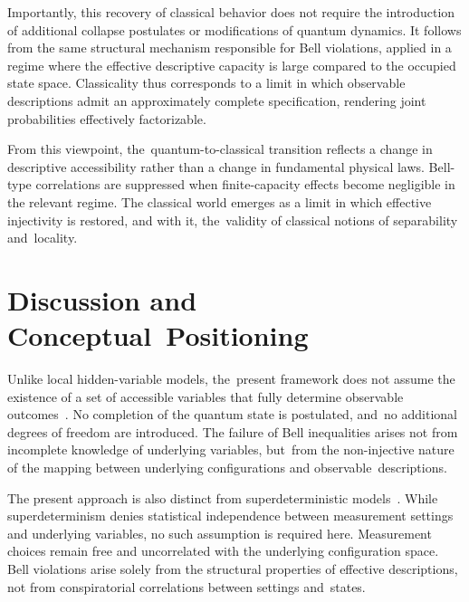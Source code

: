 \documentclass[quantumrep,article,accept,pdftex,oneauthor]{Definitions/mdpi}
\theoremstyle{remark}
\begin{document}
  Importantly, this recovery of classical behavior does not require the introduction
  of additional collapse postulates or modifications of quantum dynamics.
  It follows from the same structural mechanism responsible for Bell violations,
  applied in a regime where the effective descriptive capacity is large compared to
  the occupied state space.
  Classicality thus corresponds to a limit in which observable descriptions admit an
  approximately complete specification, rendering joint probabilities effectively
  factorizable.

  From this viewpoint, the~quantum-to-classical transition reflects a change in
  descriptive accessibility rather than a change in fundamental physical laws.
  Bell-type correlations are suppressed when finite-capacity effects become negligible
  in the relevant regime.
  The classical world emerges as a limit in which effective injectivity is restored,
  and with it, the~validity of classical notions of separability and~locality.

  \section{Discussion and Conceptual~Positioning}
  \label{sec:discussion}


  Unlike local hidden-variable models, the~present framework does not assume the
  existence of a set of accessible variables that fully determine observable outcomes~\cite{tHooft2016CAI}.
  No completion of the quantum state is postulated, and~no additional degrees of
  freedom are introduced.
  The failure of Bell inequalities arises not from incomplete knowledge of underlying
  variables, but~from the non-injective nature of the mapping between underlying
  configurations and observable~descriptions.

  The present approach is also distinct from superdeterministic models~\cite{Hall2010LocalDeterministic}.
  While superdeterminism denies statistical independence between measurement settings
  and underlying variables, no such assumption is required here.
  Measurement choices remain free and uncorrelated with the underlying configuration space.
  Bell violations arise solely from the structural properties of effective descriptions,
  not from conspiratorial correlations between settings and~states.
\end{document}
